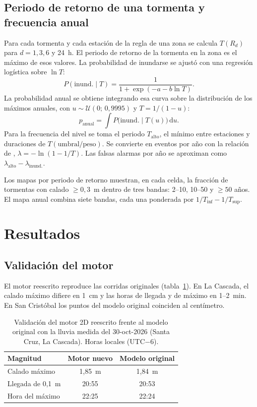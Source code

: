 \documentclass{sosg-informe}
\begin{document}
\subsection{Periodo de retorno de una tormenta y frecuencia anual}\label{sec:frecuencia}
Para cada tormenta y cada estación de la regla de una zona se calcula $T(R_d)$ para $d = 1, 3, 6$ y 24~h. El periodo de retorno de la tormenta en la zona es el máximo de esos valores. La probabilidad de inundarse se ajustó con una regresión logística sobre $\ln T$:
\begin{equation}
  P(\text{inund.} \mid T) = \frac{1}{1 + \exp\left(-a - b \ln T\right)}.
\end{equation}
La probabilidad anual se obtiene integrando esa curva sobre la distribución de los máximos anuales, con $u \sim \mathcal{U}(0;\,0,9995)$ y $T = 1/(1-u)$:
\begin{equation}
  p_{\text{anual}} = \int P\bigl(\text{inund.} \mid T(u)\bigr)\, \mathrm{d}u .
\end{equation}
Para la frecuencia del nivel \alto{} se toma el periodo $T_{\text{alto}}$, el mínimo entre estaciones y duraciones de $T(\text{umbral}/\text{peso})$. Se convierte en eventos por año con la relación de \citet{langbein1949}, $\lambda = -\ln(1 - 1/T)$. Las falsas alarmas por año se aproximan como $\lambda_{\text{alto}} - \lambda_{\text{inund.}}$.

Los mapas por periodo de retorno muestran, en cada celda, la fracción de tormentas con calado $\geq 0,3$~m dentro de tres bandas: 2--10, 10--50 y $\geq 50$ años. El mapa anual combina siete bandas, cada una ponderada por $1/T_{\inf} - 1/T_{\sup}$.

\section{Resultados}

\subsection{Validación del motor}
El motor reescrito reproduce las corridas originales (tabla~\ref{tab:validacion}). En La Cascada, el calado máximo difiere en 1~cm y las horas de llegada y de máximo en 1--2~min. En San Cristóbal los puntos del modelo original coinciden al centímetro.

\begin{table}[ht]
  \centering\small
  \caption{Validación del motor 2D reescrito frente al modelo original con la lluvia medida del 30-oct-2026 (Santa Cruz, La Cascada). Horas locales (UTC$-6$).}
  \label{tab:validacion}
  \begin{tabular}{lcc}
    \toprule
    Magnitud & Motor nuevo & Modelo original \\
    \midrule
    Calado máximo & 1,85~m & 1,84~m \\
    Llegada de 0,1~m & 20:55 & 20:53 \\
    Hora del máximo & 22:25 & 22:24 \\
    \bottomrule
  \end{tabular}
\end{table}
\end{document}
